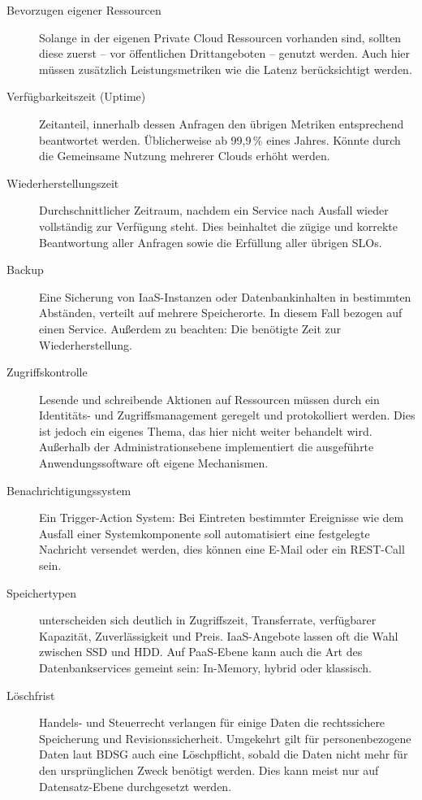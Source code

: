 \begin{description}
	\item[Bevorzugen eigener Ressourcen] Solange in der eigenen Private Cloud Ressourcen vorhanden sind, sollten diese zuerst -- vor öffentlichen Drittangeboten -- genutzt werden. Auch hier müssen zusätzlich Leistungsmetriken wie die Latenz berücksichtigt werden.
	
	\item[Verfügbarkeitszeit (Uptime)] Zeitanteil, innerhalb dessen Anfragen den übrigen Metriken entsprechend beantwortet werden. Üblicherweise ab 99,9\,\% eines Jahres. Könnte durch die Gemeinsame Nutzung mehrerer Clouds erhöht werden.	
	
	\item[Wiederherstellungszeit] Durchschnittlicher Zeitraum, nachdem ein Service nach Ausfall wieder vollständig zur Verfügung steht. Dies beinhaltet die zügige und korrekte Beantwortung aller Anfragen sowie die Erfüllung aller übrigen SLOs.
	
	\item[Backup] Eine Sicherung von IaaS-Instanzen oder Datenbankinhalten in bestimmten Abständen, verteilt auf mehrere Speicherorte. In diesem Fall bezogen auf einen Service. Außerdem zu beachten: Die benötigte Zeit zur Wiederherstellung.
	
	\item[Zugriffskontrolle] Lesende und schreibende Aktionen auf Ressourcen müssen durch ein Identitäts- und Zugriffsmanagement geregelt und protokolliert werden. Dies ist jedoch ein eigenes Thema, das hier nicht weiter behandelt wird. Außerhalb der Administrationsebene implementiert die ausgeführte Anwendungssoftware oft eigene Mechanismen.
		
	\item[Benachrichtigungssystem] Ein Trigger-Action System: Bei Eintreten bestimmter Ereignisse wie dem Ausfall einer Systemkomponente soll automatisiert eine festgelegte Nachricht versendet werden, dies können eine E-Mail oder ein REST-Call sein.
	
	\item[Speichertypen] unterscheiden sich deutlich in Zugriffszeit, Transferrate, verfügbarer Kapazität, Zuverlässigkeit und Preis. IaaS-Angebote lassen oft die Wahl zwischen SSD und HDD. Auf PaaS-Ebene kann auch die Art des Datenbankservices gemeint sein: In-Memory, hybrid oder klassisch.
	
	\item[Löschfrist] Handels- und Steuerrecht verlangen für einige Daten die rechtssichere Speicherung und Revisionssicherheit. Umgekehrt gilt für personenbezogene Daten laut BDSG auch eine Löschpflicht, sobald die Daten nicht mehr für den ursprünglichen Zweck benötigt werden. Dies kann meist nur auf Datensatz-Ebene durchgesetzt werden. 
	

\end{description}
